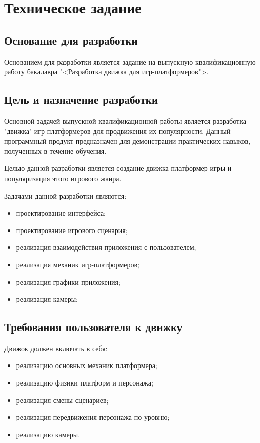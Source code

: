 \section{Техническое задание}
\subsection{Основание для разработки}

Основанием для разработки является задание на выпускную квалификационную работу бакалавра "<Разработка движка \textquotedbl для игр-платформеров">.

\subsection{Цель и назначение разработки}

Основной задачей выпускной квалификационной работы является разработка "движка" игр-платформеров для продвижения их популярности. Данный программный продукт предназначен для демонстрации практических навыков, полученных в течение обучения.

Целью данной разработки является создание движка платформер игры и популяризация этого игрового жанра.

Задачами данной разработки являются:
\begin{itemize}
\item проектирование интерфейса;
\item проектирование игрового сценария;
\item реализация взаимодействия приложения с пользователем;
\item реализация механик игр-платформеров;
\item реализация графики приложения;
\item реализация камеры;
\end{itemize}

\subsection{Требования пользователя к движку}

Движок должен включать в себя:
\begin{itemize}
    \item реализацию основных механик платформера;
    \item реализацию физики платформ и персонажа;
    \item реализация смены сценариев;
    \item реализация передвижения персонажа по уровню;
    \item реализацию камеры.
\end{itemize}



